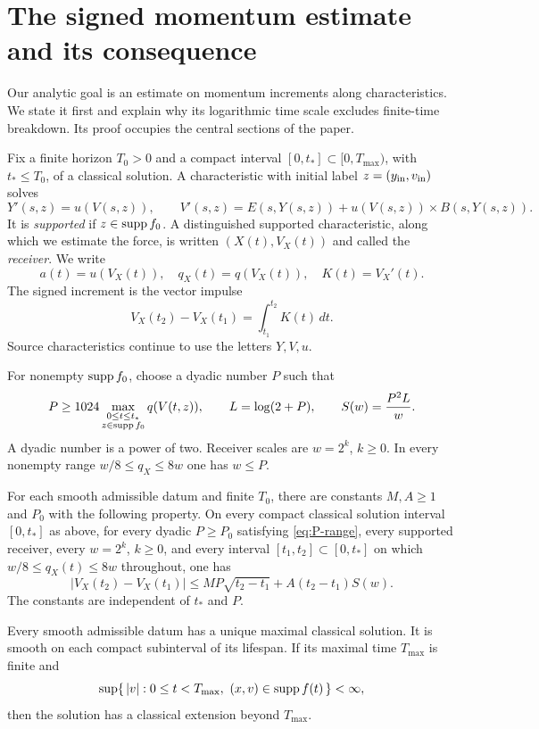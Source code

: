 \section{The signed momentum estimate and its consequence}\label{sec:setup}
Our analytic goal is an estimate on momentum increments along
characteristics. We state it first and explain why its logarithmic time
scale excludes finite-time breakdown. Its proof occupies the central
sections of the paper.

Fix a finite horizon $T_0>0$ and a compact interval
$[0,t_*]\subset[0,T_{\max})$, with $t_*\le T_0$, of a classical solution.
A characteristic with initial label $z=(y_{\rm in},v_{\rm in})$ solves
\[
 Y'(s,z)=u(V(s,z)),\qquad
 V'(s,z)=E(s,Y(s,z))+u(V(s,z))\times B(s,Y(s,z)).
\]
It is \emph{supported} if $z\in\operatorname{supp} f_0$.
A distinguished supported characteristic, along which we estimate the
force, is written $(X(t),V_X(t))$ and called the \emph{receiver}.
We write
\[
 a(t)=u(V_X(t)),\quad q_X(t)=q(V_X(t)),\quad K(t)=V_X'(t).
\]
The signed increment is the vector impulse
\[
 V_X(t_2)-V_X(t_1)=\int_{t_1}^{t_2}K(t)\,dt.
\]
Source characteristics continue to use the letters $Y,V,u$.

For nonempty $\operatorname{supp} f_0$, choose a dyadic number $P$ such that
\begin{equation}\label{eq:P-range}
 P\ge1024\max_{\substack{0\le t\le t_*\\z\in\operatorname{supp} f_0}}q(V(t,z)),
 \qquad L=\log(2+P),\qquad S(w)=\frac{P^2L}{w}.
\end{equation}
A dyadic number is a power of two. Receiver scales are $w=2^k$, $k\ge0$.
In every nonempty range $w/8\le q_X\le8w$ one has $w\le P$.

\begin{proposition}\label{prop:increment}
For each smooth admissible datum and finite $T_0$, there are constants
$M,A\ge1$ and $P_0$ with the following property. On every compact
classical solution interval $[0,t_*]$ as above, for every dyadic
$P\ge P_0$ satisfying \eqref{eq:P-range}, every supported receiver,
every $w=2^k$, $k\ge0$, and every interval $[t_1,t_2]\subset[0,t_*]$
on which $w/8\le q_X(t)\le8w$ throughout, one has
\begin{equation}\label{eq:bootstrap}
 |V_X(t_2)-V_X(t_1)|
 \le MP\sqrt{t_2-t_1}+A(t_2-t_1)S(w).
\end{equation}
The constants are independent of $t_*$ and $P$.
\end{proposition}

\begin{proposition}\label{prop:continuation}
Every smooth admissible datum has a unique maximal classical solution.
It is smooth on each compact subinterval of its lifespan. If its
maximal time $T_{\max}$ is finite and
\[
 \sup\{\,|v|:0\le t<T_{\max},\ (x,v)\in\operatorname{supp} f(t)\,\}<\infty,
\]
then the solution has a classical extension beyond $T_{\max}$.
\end{proposition}

